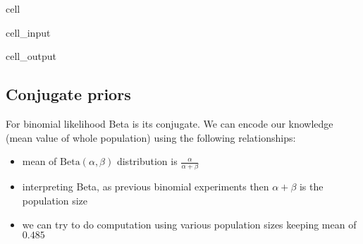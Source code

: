 \documentclass[letterpaper,10pt,english]{jupyterBook}
\begin{document}
\begin{sphinxuseclass}{cell}\begin{sphinxVerbatimInput}

\begin{sphinxuseclass}{cell_input}
\begin{sphinxVerbatim}[commandchars=\\\{\}]
\end{sphinxVerbatim}

\end{sphinxuseclass}\end{sphinxVerbatimInput}
\begin{sphinxVerbatimOutput}

\begin{sphinxuseclass}{cell_output}
\noindent{}

\end{sphinxuseclass}\end{sphinxVerbatimOutput}

\end{sphinxuseclass}

\subsection{Conjugate priors}
\label{\detokenize{Lecture 2:conjugate-priors}}
\sphinxAtStartPar
For binomial likelihood Beta is its conjugate. We can encode our knowledge (mean value of whole population) using the following relationships:
\begin{itemize}
\item {} 
\sphinxAtStartPar
mean of \(\mathrm{Beta}(\alpha,\beta)\) distribution is \(\frac{\alpha}{\alpha+\beta}\)

\item {} 
\sphinxAtStartPar
interpreting Beta, as previous binomial experiments then \(\alpha+\beta\) is the population size

\item {} 
\sphinxAtStartPar
we can try to do computation using various population sizes keeping mean of \(0.485\)

\end{itemize}
\end{document}
